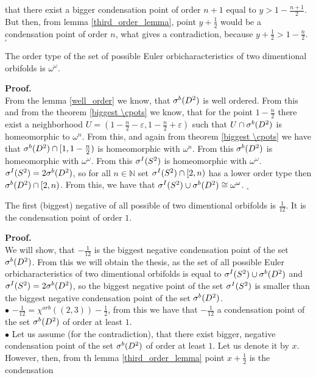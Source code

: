that there exist a bigger condensation point of order $n+1$ equal to $y > 1-\frac{n+1}{2}$. 
But then, from lemma \ref{third_order_lemma}, point $y+\frac{1}{2}$ would be a condensation point 
of order $n$, what gives a contradiction, because $y+\frac{1}{2}>1-\frac{n}{2}$. $_\square$ \\
\begin{theorem}
The order type of the set of possible Euler orbicharacteristics of two dimentional orbifolds 
is $\omega^\omega$. 
\end{theorem}
\noindent\textbf{Proof.} \\
From the lemma \ref{well_order} we know, that ${\mathcal{\sigma}^b(D^2)}$ is well ordered. From this and 
from the theorem \ref{biggest \cpots} we know, that for the point $1-\frac{n}{2}$ there exist 
a neighborhood $U=(1-\frac{n}{2}-\varepsilon,1-\frac{n}{2}+\varepsilon)$ such that $U \cap 
{\mathcal{\sigma}^b(D^2)}$ is homeomorphic to $\omega^n$. From this, and again from theorem \ref{biggest \cpots} 
we have that ${\mathcal{\sigma}^b(D^2)} \cap [1,1-\frac{n}{2})$ is homeomorphic with $\omega^n$. 
From this ${\mathcal{\sigma}^b(D^2)}$ is homeomorphic with $\omega^\omega$. From this ${\mathcal{\sigma}^I(S^2)}$ is homeomorphic 
with $\omega^\omega$. \\
${\mathcal{\sigma}^I(S^2)} = 2{\mathcal{\sigma}^b(D^2)}$, so for all $n\in\mathbb{N}$ set ${\mathcal{\sigma}^I(S^2)} \cap [2,n)$ has a lower order type then 
${\mathcal{\sigma}^b(D^2)}\cap [2,n)$. From this, we have that ${\mathcal{\sigma}^I(S^2)} \cup {\mathcal{\sigma}^b(D^2)} \cong \omega^\omega$. $_\square$ 
\begin{theorem}
The first (biggest) negative \cpots of all possible \Eoc of two dimentional orbifolds is 
$\frac{1}{12}$. It is the condensation point of order $1$. 
\end{theorem}
\noindent\textbf{Proof.} \\
We will show, that $-\frac{1}{12}$ is the biggest negative condensation point of the set ${\mathcal{\sigma}^b(D^2)}$. 
From this we will obtain the thesis, as the set of all possible Euler orbicharacteristics 
of two dimentional orbifolds is equal to ${\mathcal{\sigma}^I(S^2)} \cup {\mathcal{\sigma}^b(D^2)}$ and ${\mathcal{\sigma}^I(S^2)} = 2{\mathcal{\sigma}^b(D^2)}$, so 
the biggest negative point of the set ${\mathcal{\sigma}^I(S^2)}$ is smaller than the biggest negative condensation 
point of the set ${\mathcal{\sigma}^b(D^2)}$. \\
$\bullet$ $-\frac{1}{12}=\chi^{orb}((2,3))-\frac{1}{2}$, from this we have that $-\frac{1}{12}$ 
a condensation point of the set ${\mathcal{\sigma}^b(D^2)}$ of order at least $1$. \\
$\bullet$ Let us assume (for the contradiction), that there exist bigger, negative 
condensation point of the set ${\mathcal{\sigma}^b(D^2)}$ of order at least $1$. Let us denote it by $x$. \\
However, then, from th lemma \ref{third_order_lemma} point $x+\frac{1}{2}$ is the condensation 
